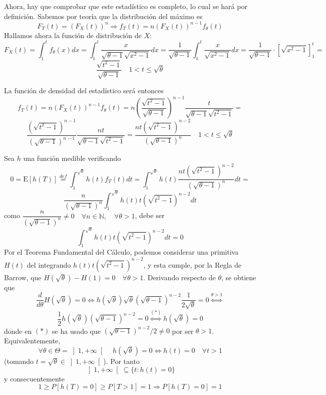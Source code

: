 \documentclass[12pt]{article}
\newcommand{\E}{\mathrm{E}}
\newcommand{\N}{\mathbb{N}}
\begin{document}
\begin{ejercicio}[1.9 puntos]
        Ahora, hay que comprobar que este estadístico es completo, lo cual se hará por definición. Sabemos por teoría que la distribución del máximo es 
        $$F_T(t) = (F_X(t))^n \Longrightarrow f_T(t) = n(F_X(t))^{n-1} f_\theta(t)$$
        Hallamos ahora la función de distribución de $X$:
        $$F_X(t) = \int_{1}^{t} f_\theta(x) dx = \int_{1}^{t} \frac{x}{\sqrt{\theta-1}\sqrt{x^2-1}} dx = 
        \dfrac{1}{\sqrt{\theta-1}} \int_{1}^{t} \frac{x}{\sqrt{x^2-1}} dx = \dfrac{1}{\sqrt{\theta-1}} \cdot \left[ \sqrt{x^2-1} \right]_{1}^{t} = $$
        $$\dfrac{\sqrt{t^2-1}}{\sqrt{\theta-1}} \quad 1 < t \leqslant \sqrt{\theta}$$

        La función de densidad del estadístico será entonces
        $$f_T(t) = n(F_X(t))^{n-1} f_\theta(t) = n \left(\dfrac{\sqrt{t^2-1}}{\sqrt{\theta-1}}\right)^{n-1} \frac{t}{\sqrt{\theta-1}\sqrt{t^2-1}} = $$
        $$\dfrac{(\sqrt{t^2-1})^{n-1}}{(\sqrt{\theta-1})^{n-1}} \frac{nt}{\sqrt{\theta-1}\sqrt{t^2-1}} = \dfrac{nt(\sqrt{t^2-1})^{n-2}}{(\sqrt{\theta-1})^{n}} \quad 1 < t \leq \sqrt{\theta}$$

        Sea $h$ una función medible verificando $$0 = \E[h(T)] \stackrel{def}{=} \int_{1}^{\sqrt{\theta}} h(t) f_T(t) dt = 
        \int_{1}^{\sqrt{\theta}} h(t) \dfrac{nt(\sqrt{t^2-1})^{n-2}}{(\sqrt{\theta-1})^{n}} dt =$$
        $$\dfrac{n}{(\sqrt{\theta-1})^{n}} \int_{1}^{\sqrt{\theta}} h(t) t(\sqrt{t^2-1})^{n-2} dt$$
        como $\dfrac{n}{(\sqrt{\theta-1})^{n}} \neq 0 \quad \forall n \in \N, \quad \forall \theta>1$, debe ser
        $$\int_{1}^{\sqrt{\theta}} h(t) t(\sqrt{t^2-1})^{n-2} dt = 0$$
        Por el Teorema Fundamental del Cálculo, podemos considerar una primitiva $H(t)$ del integrando $h(t) t(\sqrt{t^2-1})^{n-2}$, y esta cumple,
        por la Regla de Barrow, que $H(\sqrt{\theta}) - H(1) = 0 \quad \forall \theta > 1$. Derivando respecto 
        de $\theta$, se obtiene que
        $$\dfrac{d}{d \theta} H(\sqrt{\theta}) = 0 \iff h(\sqrt{\theta}) \sqrt{\theta}(\sqrt{\theta-1})^{n-2} \dfrac{1}{2 \sqrt{\theta}} = 0 \stackrel{\theta > 1}{\iff}$$
        $$\dfrac{1}{2} h(\sqrt{\theta}) (\sqrt{\theta-1})^{n-2} = 0 \stackrel{(*)}{\iff} h(\sqrt{\theta}) = 0$$
        donde en $(*)$ se ha usado que $(\sqrt{\theta-1})^{n-2} / 2 \neq 0$ por ser $\theta > 1$. Equivalentemente, 
        $$\forall \theta \in \Theta = \left] 1, + \infty \right[ \quad h(\sqrt{\theta}) = 0 \iff h(t) = 0 \quad \forall t > 1$$ (tomando $t = \sqrt{\theta} \in \left]1, +\infty \right[$).
        Por tanto $$\left]1, +\infty \right[ \subseteq \{t : h(t) = 0\}$$ y consecuentemente $$1 \geqslant P[h(T) = 0] \geqslant P[T > 1] = 1
        \Longrightarrow P[h(T) = 0] = 1$$


\end{ejercicio}
\end{document}
